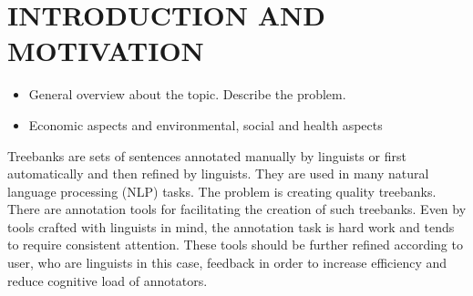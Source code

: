 \chapter{INTRODUCTION AND MOTIVATION}
\label{chapter:introduction}
\begin{itemize}
\item General overview about the topic. Describe the problem.
\item Economic aspects and environmental, social and health aspects
\end{itemize}
Treebanks are sets of sentences annotated manually by linguists or first automatically and then refined by linguists. They are used in many natural language processing (NLP) tasks. The problem is creating quality treebanks. There are annotation tools for facilitating the creation of such treebanks. Even by tools crafted with linguists in mind, the annotation task is hard work and tends to require consistent attention. These tools should be further refined according to user, who are linguists in this case, feedback in order to increase efficiency and reduce cognitive load of annotators.
